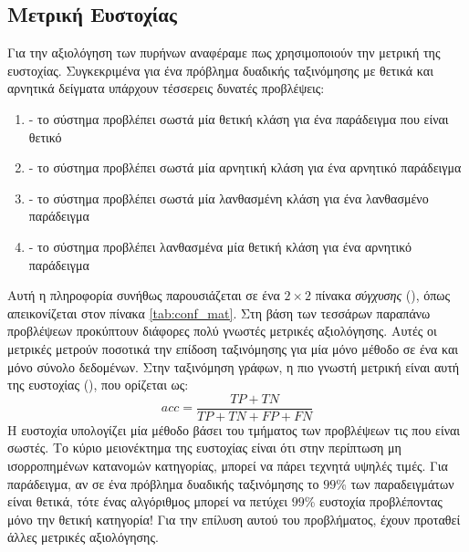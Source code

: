 \subsection{Μετρική Ευστοχίας}
\label{subsection:accuracy}
Για την αξιολόγηση των πυρήνων αναφέραμε πως χρησιμοποιούν την μετρική της ευστοχίας.
Συγκεκριμένα για ένα πρόβλημα δυαδικής ταξινόμησης με θετικά και αρνητικά δείγματα υπάρχουν τέσσερεις δυνατές προβλέψεις:
\begin{enumerate}
    \item {} - το σύστημα προβλέπει σωστά μία θετική κλάση για ένα παράδειγμα που είναι θετικό
    \item {} - το σύστημα προβλέπει σωστά μία αρνητική κλάση για ένα αρνητικό παράδειγμα
    \item {} - το σύστημα προβλέπει σωστά μία λανθασμένη κλάση για ένα λανθασμένο παράδειγμα
    \item {} - το σύστημα προβλέπει λανθασμένα μία θετική κλάση για ένα αρνητικό παράδειγμα
\end{enumerate}
Αυτή η πληροφορία συνήθως παρουσιάζεται σε ένα $2 \times 2$ πίνακα \textit{σύγχυσης} (), όπως απεικονίζεται στον πίνακα \ref{tab:conf_mat}.
Στη βάση των τεσσάρων παραπάνω προβλέψεων προκύπτουν διάφορες πολύ γνωστές μετρικές αξιολόγησης.
Αυτές οι μετρικές μετρούν ποσοτικά την επίδοση ταξινόμησης για μία μόνο μέθοδο σε ένα και μόνο σύνολο δεδομένων.
Στην ταξινόμηση γράφων, η πιο γνωστή μετρική είναι αυτή της ευστοχίας (), που ορίζεται ως:
\begin{equation}
    acc = \frac{TP + TN}{TP + TN + FP + FN}    
\end{equation}
Η ευστοχία υπολογίζει μία μέθοδο βάσει του τμήματος των προβλέψεων τις που είναι σωστές.
Το κύριο μειονέκτημα της ευστοχίας είναι ότι στην περίπτωση μη ισορροπημένων κατανομών κατηγορίας, μπορεί να πάρει τεχνητά υψηλές τιμές.
Για παράδειγμα, αν σε ένα πρόβλημα δυαδικής ταξινόμησης το $99$\% των παραδειγμάτων είναι θετικά, τότε ένας αλγόριθμος μπορεί να πετύχει $99$\% ευστοχία προβλέποντας μόνο την θετική κατηγορία!
Για την επίλυση αυτού του προβλήματος, έχουν προταθεί άλλες μετρικές αξιολόγησης.


